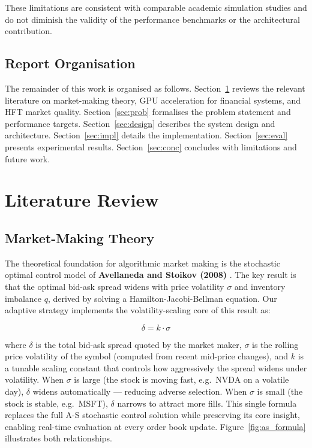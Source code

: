 \documentclass[12pt]{article}
\begin{document}
These limitations are consistent with comparable academic simulation studies
\cite{vaitonis2018} and do not diminish the validity of the performance
benchmarks or the architectural contribution.

\subsection{Report Organisation}

The remainder of this work is organised as follows. Section~\ref{sec:lit}
reviews the relevant literature on market-making theory, GPU acceleration for
financial systems, and HFT market quality. Section~\ref{sec:prob} formalises
the problem statement and performance targets. Section~\ref{sec:design}
describes the system design and architecture. Section~\ref{sec:impl} details
the implementation. Section~\ref{sec:eval} presents experimental results.
Section~\ref{sec:conc} concludes with limitations and future work.

\newpage

\section{Literature Review}
\label{sec:lit}

\subsection{Market-Making Theory}

The theoretical foundation for algorithmic market making is the stochastic
optimal control model of \textbf{Avellaneda and Stoikov (2008)}
\cite{avellaneda2008}. The key result is that the optimal bid-ask spread
widens with price volatility $\sigma$ and inventory imbalance $q$, derived
by solving a Hamilton-Jacobi-Bellman equation. Our adaptive strategy
implements the volatility-scaling core of this result as:

\begin{equation}
  \delta = k \cdot \sigma
  \label{eq:adaptive_spread}
\end{equation}

where $\delta$ is the total bid-ask spread quoted by the market maker,
$\sigma$ is the rolling price volatility of the symbol (computed from
recent mid-price changes), and $k$ is a tunable scaling constant that
controls how aggressively the spread widens under volatility. When $\sigma$
is large (the stock is moving fast, e.g.\ NVDA on a volatile day), $\delta$
widens automatically --- reducing adverse selection. When $\sigma$ is small
(the stock is stable, e.g.\ MSFT), $\delta$ narrows to attract more fills.
This single formula replaces the full A-S stochastic control solution while
preserving its core insight, enabling real-time evaluation at every order
book update. Figure~\ref{fig:as_formula} illustrates both relationships.
\end{document}
